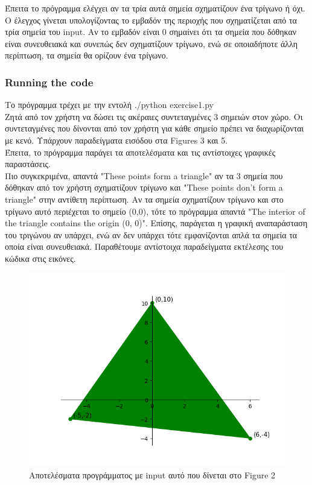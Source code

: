 \documentclass[12pt]{article}
\newenvironment{matlab}
	{\begin{figure}[hp]\centering\captionsetup{justification=centering}}
	{\end{figure}}
\begin{document}
Έπειτα το πρόγραμμα ελέγχει αν τα τρία αυτά σημεία σχηματίζουν ένα τρίγωνο ή όχι. Ο έλεγχος γίνεται υπολογίζοντας το εμβαδόν της περιοχής που σχηματίζεται από τα τρία σημεία του input. Αν το εμβαδόν είναι 0 σημαίνει ότι τα σημεία που δόθηκαν είναι συνευθειακά και συνεπώς δεν σχηματίζουν τρίγωνο, ενώ σε οποιαδήποτε άλλη περίπτωση, τα σημεία θα ορίζουν ένα τρίγωνο. \\

\subsubsection*{Running the code}

Το πρόγραμμα τρέχει με την εντολή ./python exercise1.py \\

Ζητά από τον χρήστη να δώσει τις ακέραιες συντεταγμένες 3 σημειών στον χώρο. Οι συντεταγμένες που δίνονται από τον χρήστη για κάθε σημείο πρέπει να διαχωρίζονται με κενό. Υπάρχουν παραδείγματα εισόδου στα Figures 3 και 5. \\

Έπειτα, το πρόγραμμα παράγει τα αποτελέσματα και τις αντίστοιχες γραφικές παραστάσεις. \\

Πιο συγκεκριμένα, απαντά "These points form a triangle" αν τα 3 σημεία που δόθηκαν από τον χρήστη σχηματίζουν τρίγωνο και "These points don't form a triangle" στην αντίθετη περίπτωση. Αν τα σημεία σχηματίζουν τρίγωνο και στο τρίγωνο αυτό περιέχεται το σημείο (0,0), τότε το πρόγραμμα απαντά "The interior of the triangle contains the origin (0, 0)". Επίσης, παράγεται η γραφική αναπαράσταση του τριγώνου αν υπάρχει, ενώ αν δεν υπάρχει τότε εμφανίζονται απλά τα σημεία τα οποία είναι συνευθειακά. Παραθέτουμε αντίστοιχα παραδείγματα εκτέλεσης του κώδικα στις εικόνες. \\

\begin{matlab}
	\includegraphics[scale=0.8]{images/exercise1_1.png}
	\caption{Αποτελέσματα προγράμματος με input αυτό που δίνεται στο Figure 2}
\end{matlab}
\end{document}
